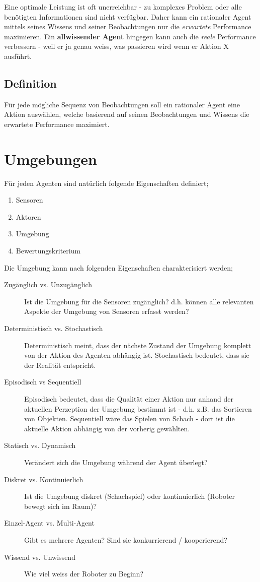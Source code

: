 Eine optimale Leistung ist oft unerreichbar - zu komplexes Problem oder alle benötigten Informationen sind nicht verfügbar. Daher kann ein rationaler Agent mittels seines Wissens und seiner Beobachtungen nur die \textit{erwartete} Performance maximieren. Ein \textbf{allwissender Agent} hingegen kann auch die \textit{reale} Performance verbessern - weil er ja genau weiss, was passieren wird wenn er Aktion X ausführt.

\subsection{Definition}
Für jede mögliche Sequenz von Beobachtungen soll ein rationaler Agent eine Aktion auswählen, welche basierend auf seinen Beobachtungen und Wissens die erwartete Performance maximiert.

\section{Umgebungen}
Für jeden Agenten sind natürlich folgende Eigenschaften definiert;
\begin{enumerate}
	\item Sensoren
	\item Aktoren
	\item Umgebung
	\item Bewertungskriterium
\end{enumerate}

Die Umgebung kann nach folgenden Eigenschaften charakterisiert werden;

\begin{description}
	\item[Zugänglich vs. Unzugänglich] Ist die Umgebung für die Sensoren zugänglich? d.h. können alle relevanten Aspekte der Umgebung von Sensoren erfasst werden?
	\item[Deterministisch vs. Stochastisch] Deterministisch meint, dass der nächste Zustand der Umgebung komplett von der Aktion des Agenten abhängig ist. Stochastisch bedeutet, dass sie der Realität entspricht.
	\item[Episodisch vs Sequentiell] Episodisch bedeutet, dass die Qualität einer Aktion nur anhand der aktuellen Perzeption der Umgebung bestimmt ist - d.h. z.B. das Sortieren von Objekten. Sequentiell wäre das Spielen von Schach - dort ist die aktuelle Aktion abhängig von der vorherig gewählten.
	\item[Statisch vs. Dynamisch] Verändert sich die Umgebung während der Agent überlegt?
	\item[Diskret vs. Kontinuierlich] Ist die Umgebung diskret (Schachspiel) oder kontinuierlich (Roboter bewegt sich im Raum)?
	\item[Einzel-Agent vs. Multi-Agent] Gibt es mehrere Agenten? Sind sie konkurrierend / kooperierend?
	\item[Wissend vs. Unwissend] Wie viel weiss der Roboter zu Beginn?
\end{description}

